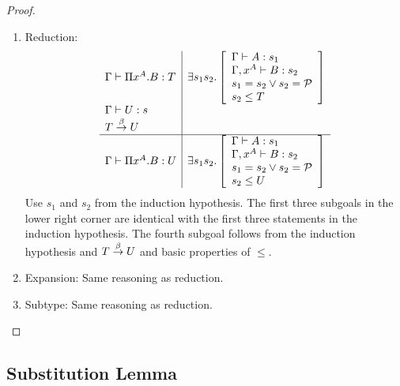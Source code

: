 \begin{theorem}
\begin{proof}
{\begin{enumerate}
\begin{enumerate}
                \item Reduction:
                $$
                \begin{array}{l|l}
                    \Gamma \vdash \Pi x^A.B : T
                    &
                    \exists s_1 s_2. \left[ \begin{array}{l} \Gamma \vdash A: s_1 \\ \Gamma,x^A \vdash B: s_2 \\ s_1 = s_2 \lor s_2 = {\cal P} \\ s_2 \le T \end{array} \right]
                    \\
                    \Gamma \vdash U: s
                    \\
                    T \stackrel{\beta}{\to} U
                    \\
                    \hline
                    \Gamma \vdash \Pi x^A.B : U
                    &
                    \exists s_1 s_2. \left[ \begin{array}{l} \Gamma \vdash A: s_1 \\ \Gamma,x^A \vdash B: s_2 \\ s_1 = s_2 \lor s_2 = {\cal P} \\ s_2 \le U \end{array} \right]
                \end{array}
                $$
                Use $s_1$ and $s_2$ from the induction hypothesis. The first
                    three subgoals in the lower right corner are identical with
                    the first three statements in the induction hypothesis. The
                    fourth subgoal follows from the induction hypothesis and $T
                    \stackrel{\beta}{\to} U$ and basic properties of $\le$.

                \item Expansion: Same reasoning as reduction.

                \item Subtype: Same reasoning as reduction.

            \end{enumerate}
        \end{enumerate}
        }
    \end{proof}
\end{theorem}





\subsection{Substitution Lemma}



